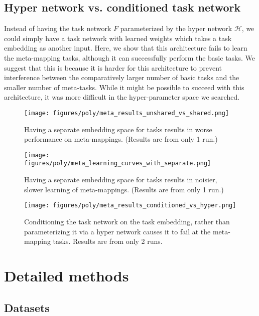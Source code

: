 \subsection{Hyper network vs. conditioned task network} \label{app_lesion_results_hyper}
Instead of having the task network $F$ parameterized by the hyper network $\mathcal{H}$, we could simply have a task network with learned weights which takes a task embedding as another input. Here, we show that this architecture fails to learn the meta-mapping tasks, although it can successfully perform the basic tasks. We suggest that this is because it is harder for this architecture to prevent interference between the comparatively larger number of basic tasks and the smaller number of meta-tasks. While it might be possible to succeed with this architecture, it was more difficult in the hyper-parameter space we searched.\par 
\begin{figure}[H]
\centering
\texttt{[image: figures/poly/meta\_results\_unshared\_vs\_shared.png]}
\caption{Having a separate embedding space for tasks results in worse performance on meta-mappings. (Results are from only 1 run.)}
\label{supp_lesion_shared_z_fig}
\end{figure}
\begin{figure}[H]
\centering
\texttt{[image: figures/poly/meta\_learning\_curves\_with\_separate.png]}
\caption{Having a separate embedding space for tasks results in noisier, slower learning of meta-mappings. (Results are from only 1 run.)}
\label{supp_lesion_shared_z_learn_fig}
\end{figure}
\begin{figure}[H]
\centering
\texttt{[image: figures/poly/meta\_results\_conditioned\_vs\_hyper.png]}
\caption{Conditioning the task network on the task embedding, rather than parameterizing it via a hyper network causes it to fail at the meta-mapping tasks. Results are from only 2 runs.}
\label{supp_lesion_hyper}
\end{figure}

\section{Detailed methods} \label{app_detailed_methods}
\subsection{Datasets}
